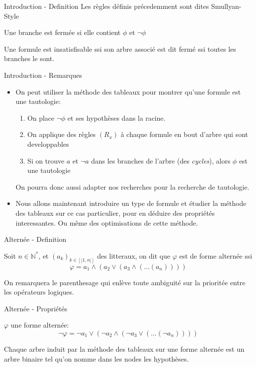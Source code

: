 \documentclass[]{beamer}
\begin{document}
\begin{frame}{Introduction - Definition}
    Les règles définis précedemment sont dites Smullyan-Style

    \begin{definition}
        Une branche est fermée si elle contient $\phi$ et $\lnot\phi$
    \end{definition}
    Une formule est insatisfisable ssi son arbre associé est dit fermé ssi toutes les branches le sont.
\end{frame}

\begin{frame}{Introduction - Remarques}
    \begin{itemize}
        \item On peut utiliser la méthode des tableaux pour montrer qu'une formule est une tautologie:
        \begin{enumerate}
            \item On place $\lnot\phi$ et ses hypothèses dans la racine.
            \item On applique des règles $(R_x)$ à chaque formule en bout d'arbre qui sont developpables
            \item Si on trouve $a$ et $\lnot a$ dans les branches de l'arbre (des \textit{cycles}), alors $\phi$ est une tautologie
        \end{enumerate}
        On pourra donc aussi adapter nos recherches pour la recherche de tautologie.
        
        \item Nous allons maintenant introduire un type de formule et étudier la méthode des tableaux sur ce cas particulier, pour en déduire des propriétés interessantes.
        Ou même des optimisations de cette méthode.
    \end{itemize}
\end{frame}

\begin{frame}{Alternée - Definition}
    \begin{definition}
        Soit $n\in\mathbb{N}^*$, et $(a_k)_{k\in [|1,n|]}$ des litteraux, on dit que $\varphi$ est de forme alternée ssi
        $$\varphi = a_1\land(a_2\lor(a_3\land(\dots(a_n))))$$
    \end{definition}
    \pause
    On remarquera le parenthesage qui enlève toute ambiguité sur la prioritée entre les opérateurs logiques.
\end{frame}

\begin{frame}{Alternée - Propriétés}
    \begin{theorem}
        $\varphi$ une forme alternée: 
        $$\lnot\varphi = \lnot a_1\lor(\lnot a_2\land(\lnot a_3 \lor(\dots(\lnot a_n))))$$
    \end{theorem}
    \pause
    \begin{theorem}
        Chaque arbre induit par la méthode des tableaux sur une forme alternée est un arbre binaire tel qu'on nomme dans les nodes les hypothèses.
    \end{theorem}
\end{frame}
\end{document}
